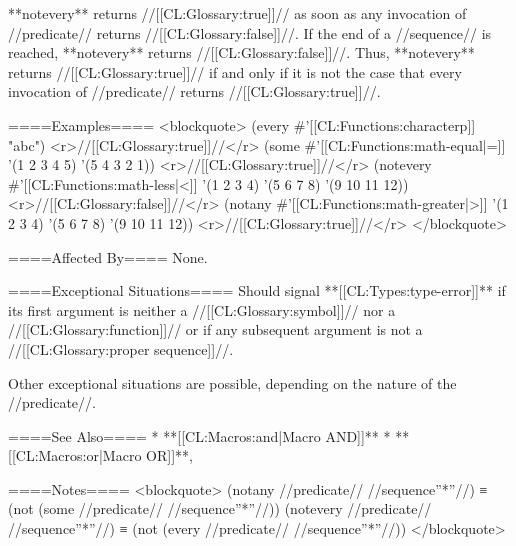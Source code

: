 **notevery** returns //[[CL:Glossary:true]]// as soon as any invocation of //predicate// returns //[[CL:Glossary:false]]//. If the end of a //sequence// is reached, **notevery** returns //[[CL:Glossary:false]]//. Thus, **notevery** returns //[[CL:Glossary:true]]// if and only if it is not the case that every invocation of //predicate// returns //[[CL:Glossary:true]]//.

====Examples====
<blockquote>
(every #'[[CL:Functions:characterp]] "abc") <r>//[[CL:Glossary:true]]//</r>
(some #'[[CL:Functions:math-equal|=]] '(1 2 3 4 5) '(5 4 3 2 1)) <r>//[[CL:Glossary:true]]//</r>
(notevery #'[[CL:Functions:math-less|<]] '(1 2 3 4) '(5 6 7 8) '(9 10 11 12)) <r>//[[CL:Glossary:false]]//</r>
(notany #'[[CL:Functions:math-greater|>]] '(1 2 3 4) '(5 6 7 8) '(9 10 11 12)) <r>//[[CL:Glossary:true]]//</r>
</blockquote>

====Affected By====
None.

====Exceptional Situations====
Should signal **[[CL:Types:type-error]]** if its first argument is neither a //[[CL:Glossary:symbol]]// nor a //[[CL:Glossary:function]]// or if any subsequent argument is not a //[[CL:Glossary:proper sequence]]//.

Other exceptional situations are possible, depending on the nature of the //predicate//.

====See Also====
  * **[[CL:Macros:and|Macro AND]]**
  * **[[CL:Macros:or|Macro OR]]**,

{\secref\TraversalRules}

====Notes====
<blockquote>
(notany //predicate// //sequence''*''//) ≡ (not (some //predicate// //sequence''*''//))
(notevery //predicate// //sequence''*''//) ≡ (not (every //predicate// //sequence''*''//))
</blockquote>

